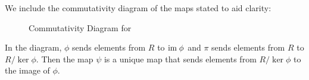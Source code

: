 \newpage

We include the commutativity diagram of the maps stated to aid clarity:
\begin{figure}[h]
    \centering
    \caption{Commutativity Diagram for }
\end{figure}

In the diagram, $\phi$ sends elements from $R$ to $\mathrm{im}\;\phi$ and $\pi$ sends elements from $R$ to $R/\ker\phi$. Then the map $\psi$ is a unique map that sends elements from $R/\ker\phi$ to the image of $\phi$.

